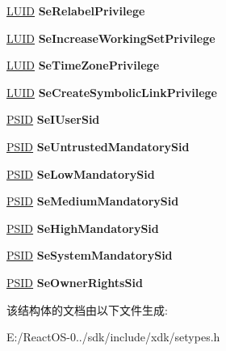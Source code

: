 \begin{DoxyCompactItemize}
\hyperlink{struct___l_u_i_d}{L\+U\+ID} {\bfseries Se\+Relabel\+Privilege}
\item 
\mbox{\label{struct___s_e___e_x_p_o_r_t_s_abb2b38fb19949b2601f6467585355e78}} 
\hyperlink{struct___l_u_i_d}{L\+U\+ID} {\bfseries Se\+Increase\+Working\+Set\+Privilege}
\item 
\mbox{\label{struct___s_e___e_x_p_o_r_t_s_a92527c8ad26548f93c5a3820564b16e7}} 
\hyperlink{struct___l_u_i_d}{L\+U\+ID} {\bfseries Se\+Time\+Zone\+Privilege}
\item 
\mbox{\label{struct___s_e___e_x_p_o_r_t_s_a0051c7cabb8b5fdb449309b61c213f49}} 
\hyperlink{struct___l_u_i_d}{L\+U\+ID} {\bfseries Se\+Create\+Symbolic\+Link\+Privilege}
\item 
\mbox{\label{struct___s_e___e_x_p_o_r_t_s_a07190a56657ced824c3e467df4ac8641}} 
\hyperlink{struct___s_i_d}{P\+S\+ID} {\bfseries Se\+I\+User\+Sid}
\item 
\mbox{\label{struct___s_e___e_x_p_o_r_t_s_a62baf56e93274acdb52a321352984b5f}} 
\hyperlink{struct___s_i_d}{P\+S\+ID} {\bfseries Se\+Untrusted\+Mandatory\+Sid}
\item 
\mbox{\label{struct___s_e___e_x_p_o_r_t_s_ae74db882b8a066fed020c7973835f16d}} 
\hyperlink{struct___s_i_d}{P\+S\+ID} {\bfseries Se\+Low\+Mandatory\+Sid}
\item 
\mbox{\label{struct___s_e___e_x_p_o_r_t_s_a6c1aad80e95d202186a1800d578aff71}} 
\hyperlink{struct___s_i_d}{P\+S\+ID} {\bfseries Se\+Medium\+Mandatory\+Sid}
\item 
\mbox{\label{struct___s_e___e_x_p_o_r_t_s_a7dc58c1ca2b409072852a4c9e3e2484c}} 
\hyperlink{struct___s_i_d}{P\+S\+ID} {\bfseries Se\+High\+Mandatory\+Sid}
\item 
\mbox{\label{struct___s_e___e_x_p_o_r_t_s_a005668c8e2529e02f2da828a768a1ce1}} 
\hyperlink{struct___s_i_d}{P\+S\+ID} {\bfseries Se\+System\+Mandatory\+Sid}
\item 
\mbox{\label{struct___s_e___e_x_p_o_r_t_s_ad2127159c53b5a6e9984e48e5967a769}} 
\hyperlink{struct___s_i_d}{P\+S\+ID} {\bfseries Se\+Owner\+Rights\+Sid}
\end{DoxyCompactItemize}


该结构体的文档由以下文件生成\+:\begin{DoxyCompactItemize}
\item 
E\+:/\+React\+O\+S-\/0../sdk/include/xdk/setypes.\+h\end{DoxyCompactItemize}
